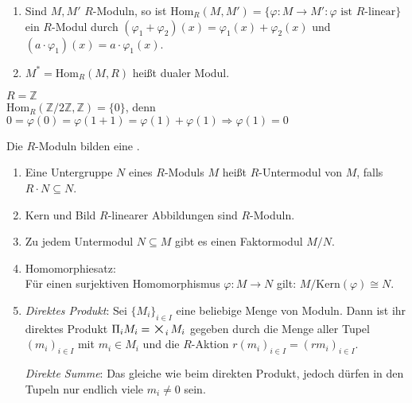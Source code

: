 \begin{BemDef}
  \begin{enumerate}
    \item Sind $M,M'$ $R$-Moduln, so ist Hom$_R(M,M') = \{\varphi: M \to M' :
          \varphi \mbox{ ist } R\mbox{-linear}\}$ ein $R$-Modul durch
          $(\varphi_1 + \varphi_2)(x) = \varphi_1(x) + \varphi_2(x)$ und
          $(a \cdot \varphi_1)(x) = a \cdot \varphi_1(x)$.
    \item $M^* = \mbox{Hom}_R(M,R)$ heißt dualer Modul.
  \end{enumerate}
\end{BemDef}

\newcommand{\BIGOP}[1]{\mathop{\mathchoice%
{\raise-0.22em\hbox{\huge $#1$}}%
{\raise-0.05em\hbox{\Large $#1$}}{\hbox{\large $#1$}}{#1}}}
\newcommand{\bigtimes}{\BIGOP{\times}} 

\begin{nnBsp}
  $R = \mathbb{Z}$\\
  Hom$_R(\mathbb{Z}/2\mathbb{Z}, \mathbb{Z}) = \{ 0 \}$, denn $0 = \varphi(0) =
  \varphi(1 + 1) = \varphi(1)+\varphi(1) \Rightarrow \varphi(1) = 0$
\end{nnBsp}

\begin{Bem}
  Die $R$-Moduln bilden eine  .
  \begin{enumerate}
    \item Eine Untergruppe $N$ eines $R$-Moduls $M$ heißt $R$-Untermodul von
          $M$, falls $R \cdot N \subseteq N$.
    \item Kern und Bild $R$-linearer Abbildungen sind $R$-Moduln.
    \item Zu jedem Untermodul $N \subseteq M$ gibt es einen Faktormodul $M/N$.
    \item Homomorphiesatz:\\Für einen surjektiven Homomorphismus $\varphi: M
          \rightarrow N$ gilt: $M/\mbox{Kern}(\varphi) \cong N$.
    \item \emph{Direktes Produkt}: Sei ${\{M_{i}\}}_{i \in I}$ eine beliebige
          Menge von Moduln. Dann ist ihr direktes Produkt
     	  $\Pi_i M_i = \bigtimes_i M_i$ gegeben durch die Menge aller Tupel ${(m_i)}_{i
     	  \in I}$ mit $m_i \in M_i$ und die $R$-Aktion ${r(m_i)}_{i \in I} = {(rm_i)}_{i \in I}$.

	  \emph{Direkte Summe}: Das gleiche wie beim direkten Produkt, jedoch dürfen in den 
	  Tupeln nur endlich viele $m_i \neq 0$ sein.
  \end{enumerate}
\end{Bem}

